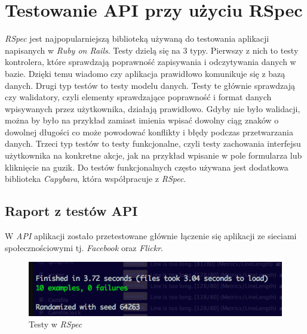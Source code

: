 \documentclass[openright]{xmgr}
\begin{document}
\section{Testowanie API przy użyciu RSpec}
\textit{RSpec} jest najpopularniejszą biblioteką używaną do testowania aplikacji napisanych w \textit{Ruby on Rails}. Testy dzielą się na 3 typy. Pierwszy z nich to testy kontrolera, które sprawdzają poprawność zapisywania i odczytywania danych w bazie. Dzięki temu wiadomo czy aplikacja prawidłowo komunikuje się z bazą danych. Drugi typ testów to testy modelu danych. Testy te głównie sprawdzają czy walidatory, czyli elementy sprawdzające poprawność i format danych wpisywanych przez użytkownika, działają prawidłowo. Gdyby nie było walidacji, można by było na przykład zamiast imienia wpisać dowolny ciąg znaków o dowolnej długości co może powodować konflikty i błędy podczas przetwarzania danych. Trzeci typ testów to testy funkcjonalne, czyli testy zachowania interfejsu użytkownika na konkretne akcje, jak na przykład wpisanie w pole formularza lub kliknięcie na guzik. Do testów funkcjonalnych często używana jest dodatkowa biblioteka \textit{Capybara}, która współpracuje z \textit{RSpec}. 

\subsection{Raport z testów API}
W \textit{API} aplikacji zostało przetestowane głównie łączenie się aplikacji ze sieciami społecznościowymi tj. \textit{Facebook} oraz \textit{Flickr}. \begin{figure}[H]
\centering
\includegraphics[width=1\hsize]{images/rails_testy.png}
\caption{Testy w \textit{RSpec}\label{RYS.1}}
\end{figure}
\end{document}
